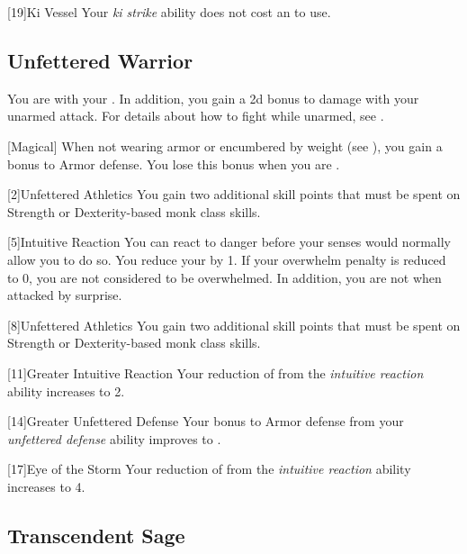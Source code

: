             [19]{Ki Vessel} Your \textit{ki strike} ability does not cost an  to use.

        \subsection{Unfettered Warrior}
            You are  with your .
            In addition, you gain a \plus2d bonus to damage with your unarmed attack.
            For details about how to fight while unarmed, see .

            [Magical]
            When not wearing armor or encumbered by weight (see ), you gain a  bonus to Armor defense.
            You lose this bonus when you are \helpless.

            [2]{Unfettered Athletics} You gain two additional skill points that must be spent on Strength or Dexterity-based monk class skills.

            [5]{Intuitive Reaction} You can react to danger before your senses would normally allow you to do so.
            You reduce your  by 1.
            If your overwhelm penalty is reduced to 0, you are not considered to be overwhelmed.
            In addition, you are not \unaware when attacked by surprise.

            [8]{Unfettered Athletics} You gain two additional skill points that must be spent on Strength or Dexterity-based monk class skills.

            [11]{Greater Intuitive Reaction}
            Your reduction of  from the \textit{intuitive reaction} ability increases to 2.

            [14]{Greater Unfettered Defense}
            Your bonus to Armor defense from your \textit{unfettered defense} ability improves to .

            [17]{Eye of the Storm}
            Your reduction of  from the \textit{intuitive reaction} ability increases to 4.

        \subsection{Transcendent Sage}

